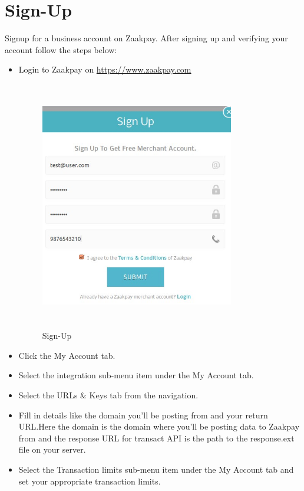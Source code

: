 \documentclass{article}
\begin{document}
\section{Sign-Up}
Signup for a business account on Zaakpay. After signing up and verifying your account
follow the steps below:
\begin{itemize}
\item  Login to Zaakpay on \url{https://www.zaakpay.com}
\begin{figure}[H]
\centering
\caption{Sign-Up}
\includegraphics[width=0.8\textwidth,height=4.3in]{Signup1.png}
\end{figure}
\item  Click the My Account tab.
\item  Select the integration sub-menu item under the My Account tab.
\item   Select the URLs \& Keys tab from the navigation.
\item  Fill in details like the domain you'll be posting from and your return URL.Here the domain is the domain where you'll be posting data to Zaakpay from and the response URL for transact API is the path to the response.ext file on your server.
\item Select the Transaction limits sub-menu item under the My Account tab and set your appropriate transaction limits.
\end{itemize}
\end{document}
